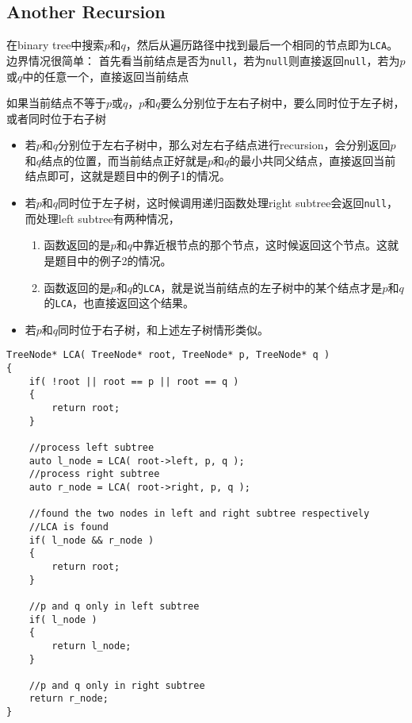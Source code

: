 \subsection{Another Recursion}
\begin{CJK*}{UTF8}{gbsn}
在binary tree中搜索$p$和$q$，然后从遍历路径中找到最后一个相同的节点即为\texttt{LCA}。边界情况很简单： 首先看当前结点是否为\texttt{null}，若为\texttt{null}则直接返回\texttt{null}，若为$p$或$q$中的任意一个，直接返回当前结点
\par
如果当前结点不等于$p$或$q$，$p$和$q$要么分别位于左右子树中，要么同时位于左子树，或者同时位于右子树
\begin{itemize}
\item 若$p$和$q$分别位于左右子树中，那么对左右子结点进行recursion，会分别返回$p$和$q$结点的位置，而当前结点正好就是$p$和$q$的最小共同父结点，直接返回当前结点即可，这就是题目中的例子1的情况。
\item 若$p$和$q$同时位于左子树，这时候调用递归函数处理right subtree会返回\texttt{null}， 而处理left subtree有两种情况，
\begin{enumerate}
\item 函数返回的是$p$和$q$中靠近根节点的那个节点，这时候返回这个节点。这就是题目中的例子2的情况。
\item 函数返回的是$p$和$q$的\texttt{LCA}，就是说当前结点的左子树中的某个结点才是$p$和$q$的\texttt{LCA}，也直接返回这个结果。
\end{enumerate}
\item 若$p$和$q$同时位于右子树，和上述左子树情形类似。
\end{itemize}
\end{CJK*}
\begin{lstlisting}[style=customc, caption={Recursion Based On Left And Right Subtree}]
TreeNode* LCA( TreeNode* root, TreeNode* p, TreeNode* q )
{
    if( !root || root == p || root == q )
    {
        return root;
    }

    //process left subtree
    auto l_node = LCA( root->left, p, q );
    //process right subtree
    auto r_node = LCA( root->right, p, q );

    //found the two nodes in left and right subtree respectively
    //LCA is found
    if( l_node && r_node )
    {
        return root;
    }

    //p and q only in left subtree
    if( l_node )
    {
        return l_node;
    }

    //p and q only in right subtree
    return r_node;
}
\end{lstlisting}
